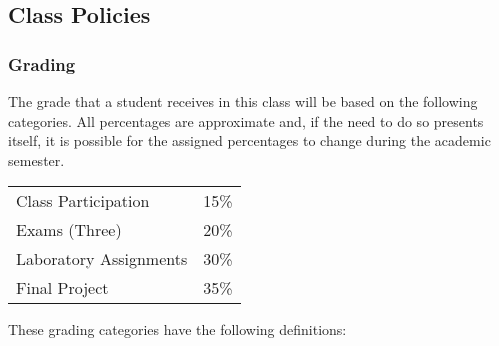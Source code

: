 \documentclass[11pt]{article} %
\begin{document}
\subsection*{\textbf{Class Policies}}

\subsubsection*{\textbf{Grading}}

The grade that a student receives in this class will be based on the following categories. All percentages are approximate and, if the need to do so presents itself, it is possible for the assigned percentages to change during the academic semester. 
\color{red}
\begin{center}
  \begin{tabular}{l|l}
\hline
    Class Participation & 15\% \\  %
    Exams  (Three) & 20\% \\
    Laboratory  Assignments & 30\% \\
    Final Project & 35\% \\
\hline
  \end{tabular}
\end{center}
\color{black}
\noindent
These grading categories have the following definitions:
\vspace*{-.05in}
\end{document}
